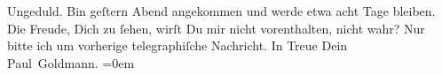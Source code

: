 \begin{ledgroupsized}[t]{13cm}
               Ungeduld. Bin geſtern{ }Abend angekommen und werde etwa acht Tage bleiben. Die Freude, Dich zu
               ſehen, wirſt Du mir nicht vorenthalten, nicht wahr? Nur bitte ich um vorherige
               telegraphiſche Nachricht. In Treue\pend
           \pstart
           Dein {\\[\baselineskip]}\spacefill\mbox{Paul Goldmann.}\pend
           \leftskip=0em{}          \endnumbering{}\end{ledgroupsized}\begin{anhang}\end{anhang}\newcommand{\dateiname}{L02715}\newcommand{\titel}{Paul Goldmann an Arthur Schnitzler, 12. 9. [1893]}\newcommand{\editorInnen}{Martin Anton Müller und Laura Untner}
            \footnotesize
\begin{ledgroupsized}[t]{11.5cm}
\end{ledgroupsized}
         
      